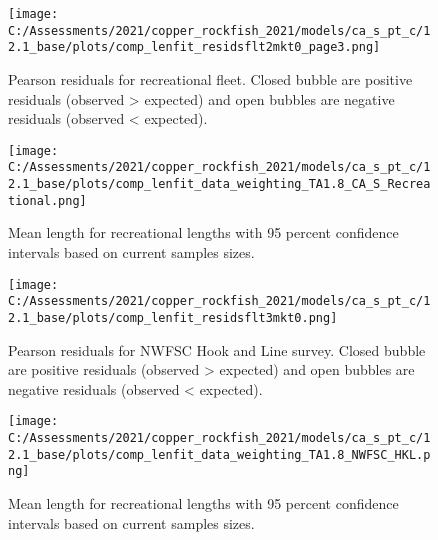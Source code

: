 \documentclass[11pt,
  english,
  a4paper,
]{article}
\begin{document}
\begin{figure}
\centering
\texttt{[image: C:/Assessments/2021/copper\_rockfish\_2021/models/ca\_s\_pt\_c/12.1\_base/plots/comp\_lenfit\_residsflt2mkt0\_page3.png]}
\caption{Pearson residuals for recreational fleet. Closed bubble are positive residuals (observed \textgreater{} expected) and open bubbles are negative residuals (observed \textless{} expected).\label{fig:rec-pearson}}
\end{figure}

\tagmcend\tagstructend


\begin{figure}
\centering
\texttt{[image: C:/Assessments/2021/copper\_rockfish\_2021/models/ca\_s\_pt\_c/12.1\_base/plots/comp\_lenfit\_data\_weighting\_TA1.8\_CA\_S\_Recreational.png]}
\caption{Mean length for recreational lengths with 95 percent confidence intervals based on current samples sizes.\label{fig:rec-mean-len-fit}}
\end{figure}

\tagmcend\tagstructend


\begin{figure}
\centering
\texttt{[image: C:/Assessments/2021/copper\_rockfish\_2021/models/ca\_s\_pt\_c/12.1\_base/plots/comp\_lenfit\_residsflt3mkt0.png]}
\caption{Pearson residuals for NWFSC Hook and Line survey. Closed bubble are positive residuals (observed \textgreater{} expected) and open bubbles are negative residuals (observed \textless{} expected).\label{fig:hkl-pearson}}
\end{figure}

\tagmcend\tagstructend


\begin{figure}
\centering
\texttt{[image: C:/Assessments/2021/copper\_rockfish\_2021/models/ca\_s\_pt\_c/12.1\_base/plots/comp\_lenfit\_data\_weighting\_TA1.8\_NWFSC\_HKL.png]}
\caption{Mean length for recreational lengths with 95 percent confidence intervals based on current samples sizes.\label{fig:hkl-mean-len-fit}}
\end{figure}
\end{document}
